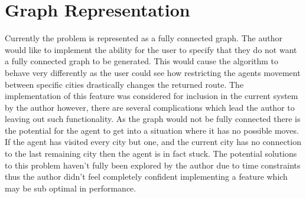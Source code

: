 \section{Graph Representation}

Currently the problem is represented as a fully connected graph. The author would like to implement the ability for the user to specify that they do not want a fully connected graph to be generated. This would cause the algorithm to behave very differently as the user could see how restricting the agents movement between specific cities drastically changes the returned route. The implementation of this feature was considered for inclusion in the current system by the author however, there are several complications which lead the author to leaving out such functionality. As the graph would not be fully connected there is the potential for the agent to get into a situation where it has no possible moves. If the agent has visited every city but one, and the current city has no connection to the last remaining city then the agent is in fact stuck. The potential solutions to this problem haven’t fully been explored by the author due to time constraints thus the author didn’t feel completely confident implementing a feature which may be sub optimal in performance.
